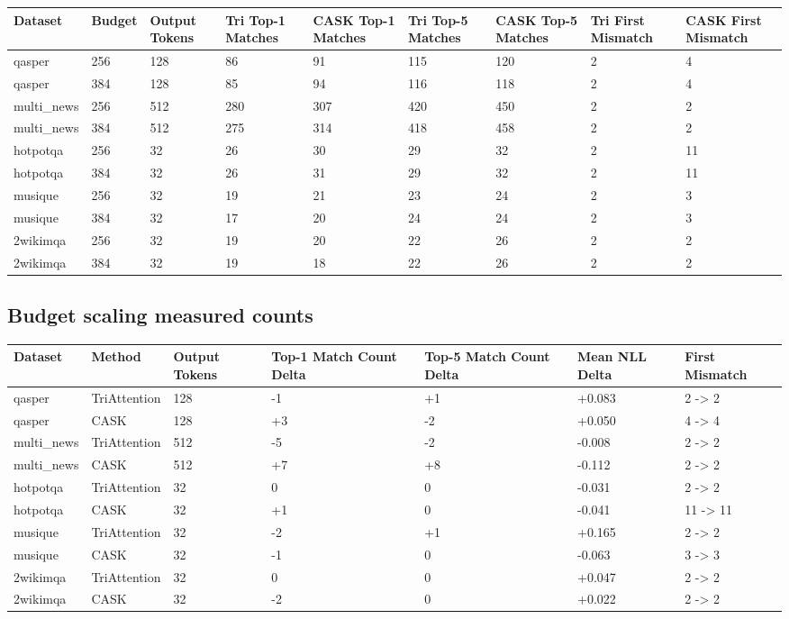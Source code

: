 \begin{table}[H]
\centering
\small
\begin{tabularx}{\textwidth}{YYYYYYYYY}
\toprule
Dataset & Budget & Output Tokens & Tri Top-1 Matches & CASK Top-1 Matches & Tri Top-5 Matches & CASK Top-5 Matches & Tri First Mismatch & CASK First Mismatch \\
\midrule
qasper & 256 & 128 & 86 & 91 & 115 & 120 & 2 & 4 \\
qasper & 384 & 128 & 85 & 94 & 116 & 118 & 2 & 4 \\
multi\_news & 256 & 512 & 280 & 307 & 420 & 450 & 2 & 2 \\
multi\_news & 384 & 512 & 275 & 314 & 418 & 458 & 2 & 2 \\
hotpotqa & 256 & 32 & 26 & 30 & 29 & 32 & 2 & 11 \\
hotpotqa & 384 & 32 & 26 & 31 & 29 & 32 & 2 & 11 \\
musique & 256 & 32 & 19 & 21 & 23 & 24 & 2 & 3 \\
musique & 384 & 32 & 17 & 20 & 24 & 24 & 2 & 3 \\
2wikimqa & 256 & 32 & 19 & 20 & 22 & 26 & 2 & 2 \\
2wikimqa & 384 & 32 & 19 & 18 & 22 & 26 & 2 & 2 \\
\bottomrule
\end{tabularx}
\end{table}


\subsection{Budget scaling measured counts}


\begin{table}[H]
\centering
\small
\begin{tabularx}{\textwidth}{YYYYYYY}
\toprule
Dataset & Method & Output Tokens & Top-1 Match Count Delta & Top-5 Match Count Delta & Mean NLL Delta & First Mismatch \\
\midrule
qasper & TriAttention & 128 & -1 & +1 & +0.083 & 2 -> 2 \\
qasper & CASK & 128 & +3 & -2 & +0.050 & 4 -> 4 \\
multi\_news & TriAttention & 512 & -5 & -2 & -0.008 & 2 -> 2 \\
multi\_news & CASK & 512 & +7 & +8 & -0.112 & 2 -> 2 \\
hotpotqa & TriAttention & 32 & 0 & 0 & -0.031 & 2 -> 2 \\
hotpotqa & CASK & 32 & +1 & 0 & -0.041 & 11 -> 11 \\
musique & TriAttention & 32 & -2 & +1 & +0.165 & 2 -> 2 \\
musique & CASK & 32 & -1 & 0 & -0.063 & 3 -> 3 \\
2wikimqa & TriAttention & 32 & 0 & 0 & +0.047 & 2 -> 2 \\
2wikimqa & CASK & 32 & -2 & 0 & +0.022 & 2 -> 2 \\
\bottomrule
\end{tabularx}
\end{table}


